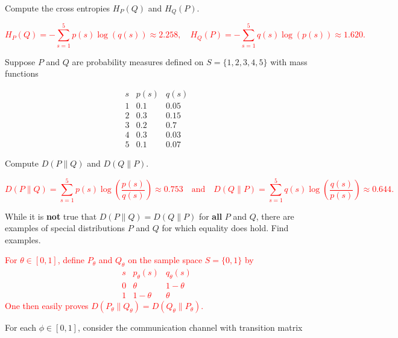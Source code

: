 \documentclass[12pt,reqno]{amsart}
\begin{document}
Compute the cross entropies $H_P( Q)$ and $H_Q( P)$.

\bigskip
\textcolor{red}{
	\[H_P(  Q) = - \sum_{s=1}^5 p(s) \log(q(s)) \approx 2.258, \quad H_Q( P) = -\sum_{s=1}^5 q(s) \log(p(s)) \approx 1.620.
	\]}
\bigskip








\prob Suppose $P$ and $Q$ are probability measures defined on $S = \{1,2,3,4,5\}$ with mass functions

	\[
	\begin{array}{c|cc}
	s & p(s) & q(s) \\ \hline
	1 & 0.1 & 0.05 \\
	2 & 0.3 & 0.15 \\
	3 & 0.2 & 0.7 \\
	4 & 0.3 & 0.03 \\
	5 & 0.1 & 0.07
	\end{array}
	\]

Compute $D( P \parallel Q)$ and $D(Q\parallel P)$.

\bigskip
\textcolor{red}{
	\[D( P \parallel Q) = \sum_{s=1}^5 p(s) \log \left( \frac{p(s)}{q(s)} \right) \approx 0.753 \quad \text{and} \quad D( Q \parallel P) = \sum_{s=1}^5 q(s) \log \left( \frac{q(s)}{p(s)} \right) \approx 0.644.
	\]}
\bigskip










\prob While it is \textbf{not} true that $D(P\parallel Q) = D(Q \parallel P)$ for \textbf{all} $P$ and $Q$, there are examples of special distributions $P$ and $Q$ for which equality does hold. Find examples.

\bigskip
\textcolor{red}{For $\theta \in [0,1]$, define $P_\theta$ and $Q_\theta$ on the sample space $S= \{0,1\}$ by
	\[\begin{array}{c|cc}
	s & p_\theta(s) & q_\theta(s) \\ \hline
	0 & \theta & 1-\theta \\
	1 & 1 - \theta & \theta
	\end{array}
	\]
One then easily proves $D(P_\theta \parallel Q_\theta) = D(Q_\theta \parallel P_\theta)$.}
\bigskip









\prob For each $\phi \in [0,1]$, consider the communication channel with transition matrix
\end{document}
